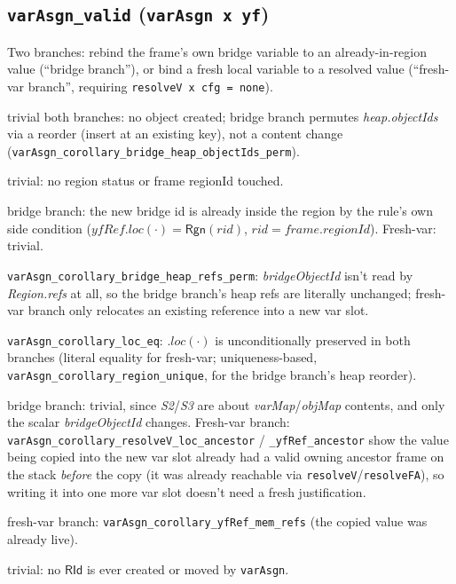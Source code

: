 \documentclass[11pt]{article}
\newcommand{\op}[1]{\texttt{#1}}
\newcommand{\thm}[1]{\textbf{\texttt{#1}}}
\begin{document}
\subsection{\thm{varAsgn\_valid} (\op{varAsgn x yf})}
Two branches: rebind the frame's own bridge variable to an already-in-region value (``bridge
branch''), or bind a fresh local variable to a resolved value (``fresh-var branch'', requiring
\op{resolveV x cfg = none}).
\begin{description}[nosep]
  \item[L1] trivial both branches: no object created; bridge branch permutes
    \textit{heap.objectIds} via a reorder (insert at an existing key), not a content change
    (\texttt{varAsgn\_corollary\_bridge\_heap\_objectIds\_perm}).
  \item[L2, S1] trivial: no region status or frame regionId touched.
  \item[H1] bridge branch: the new bridge id is already inside the region by the rule's own
    side condition ($yfRef.loc(\cdot) = \mathsf{Rgn}(rid)$, $rid = frame.regionId$). Fresh-var:
    trivial.
  \item[H2] \texttt{varAsgn\_corollary\_bridge\_heap\_refs\_perm}: \textit{bridgeObjectId} isn't
    read by \textit{Region.refs} at all, so the bridge branch's heap refs are literally
    unchanged; fresh-var branch only relocates an existing reference into a new var slot.
  \item[H3] \texttt{varAsgn\_corollary\_loc\_eq}: $.loc(\cdot)$ is unconditionally preserved in
    both branches (literal equality for fresh-var; uniqueness-based,
    \texttt{varAsgn\_corollary\_region\_unique}, for the bridge branch's heap reorder).
  \item[S2, S3] bridge branch: trivial, since \textit{S2}/\textit{S3} are about
    \textit{varMap}/\textit{objMap} contents, and only the scalar \textit{bridgeObjectId} changes.
    Fresh-var branch: \texttt{varAsgn\_corollary\_resolveV\_loc\_ancestor} /
    \texttt{\_yfRef\_ancestor} show the value being copied into the new var slot already had a
    valid owning ancestor frame on the stack \emph{before} the copy (it was already reachable via
    \op{resolveV}/\op{resolveFA}), so writing it into one more var slot doesn't need a fresh
    justification.
  \item[HS1] fresh-var branch: \texttt{varAsgn\_corollary\_yfRef\_mem\_refs} (the copied value was
    already live).
  \item[HS2] trivial: no $\mathsf{RId}$ is ever created or moved by \op{varAsgn}.
\end{description}
\end{document}
